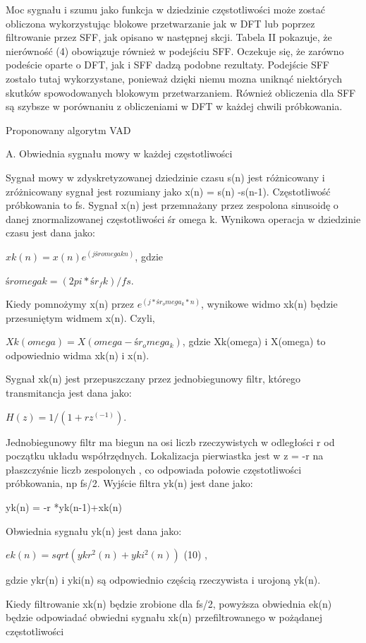 \documentclass[eng,printmode]{mgr}
\begin{document}
 Moc sygnału i szumu jako funkcja w dziedzinie częstotliwości może zostać obliczona wykorzystując  blokowe przetwarzanie jak w DFT lub poprzez filtrowanie przez SFF, jak opisano w następnej skcji. Tabela II pokazuje, że nierówność (4) obowiązuje również w podejściu SFF. Oczekuje się, że zarówno podeście oparte o DFT, jak i SFF dadzą podobne rezultaty. Podejście SFF zostało tutaj wykorzystane, ponieważ dzięki niemu mozna uniknąć niektórych skutków spowodowanych blokowym przetwarzaniem. Również obliczenia dla SFF są szybsze w porównaniu z obliczeniami w DFT w każdej chwili próbkowania.
 
 
 Proponowany algorytm VAD 
 
 A. Obwiednia sygnału mowy w każdej częstotliwości
 
 Sygnał mowy w zdyskretyzowanej dziedzinie czasu s(n) jest różnicowany i zróżnicowany sygnał jest rozumiany jako x(n) = s(n) -s(n-1). Częstotliwość próbkowania to fs. Sygnał x(n) jest przemnażany przez zespolona sinusoidę o danej znormalizowanej częstotliwości śr omega k. Wynikowa operacja w dziedzinie czasu jest dana jako: 
 
 $xk(n) = x(n)e^(j śromegak n)$, gdzie 
 
 $śr omega k = (2pi*śr_fk)/fs.$
 
 Kiedy pomnożymy x(n) przez $e^(j*śr_omega_k*n)$, wynikowe widmo xk(n) będzie przesuniętym widmem x(n). Czyli,
 
$ Xk(omega) = X(omega - śr_omega_k)$,
 gdzie Xk(omega) i X(omega) to odpowiednio widma xk(n) i x(n).
 
 Sygnał xk(n) jest przepuszczany przez jednobiegunowy filtr, którego transmitancja jest dana jako:
 
 $H(z) = 1/(1+rz^(-1)).$
 
 Jednobiegunowy filtr ma biegun na osi liczb rzeczywistych w odległości r od początku układu współrzędnych. Lokalizacja pierwiastka jest w z = -r na płaszczyśnie liczb zespolonych , co odpowiada połowie częstotliwości próbkowania, np fs/2. Wyjście filtra yk(n) jest dane jako:
 
 yk(n) = -r *yk(n-1)+xk(n)
 
 Obwiednia sygnału yk(n) jest dana jako:
 
 $ek(n) = sqrt(ykr^2(n) + yki^2(n))$ (10) , 
 
   gdzie ykr(n) i yki(n) są odpowiednio częścią rzeczywista i urojoną yk(n).
 
 Kiedy filtrowanie xk(n) będzie zrobione dla fs/2, powyższa obwiednia ek(n) będzie odpowiadać obwiedni sygnału xk(n) przefiltrowanego w pożądanej częstotliwości 
 
\end{document}

